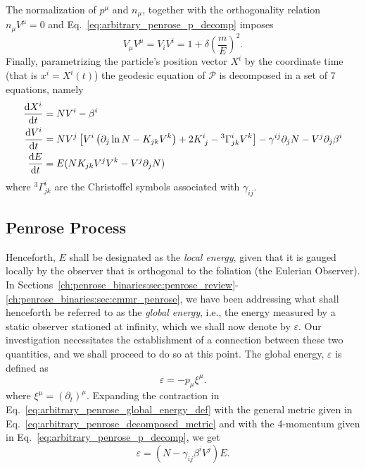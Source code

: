 The normalization of $p^\mu$ and $n_\mu$, together with the orthogonality relation $n_\mu V^\mu = 0$ and Eq.~\eqref{eq:arbitrary_penrose_p_decomp} imposes
%
\begin{equation}
  V_\mu V^\mu = V_i V^i  = 1 + \delta\left(\frac{m}{E}\right)^2.
  \label{eq:arbitrary_penrose_V_norm}
\end{equation}
%
Finally, parametrizing the particle's position vector $X^i$ by the coordinate time (that is $x^i = X^i(t)$) the geodesic equation of $\mathcal{P}$ is decomposed in a set of 7 equations, namely
%
\begin{align}
  \der{X^i}{t} & = N V^i - \beta^i \label{eq:arbitrary_penrose_geodesic_eq_X}                                                                                                                                                  \\
  \der{V^i}{t} & = N V^j\left[ V^i \left( \partial_j \ln N - K_{jk} V^k \right) + 2 \tens{K}{i}{j} - {}^3\Gamma^{i}_{jk}V^k\right] - \gamma^{ij}\partial_j N - V^j\partial_j\beta^i \label{eq:arbitrary_penrose_geodesic_eq_V} \\
  \der{E}{t}   & = E (N K_{jk} V^j V^k - V^j \partial_j N) \label{eq:arbitrary_penrose_geodesic_eq_E}
\end{align}
%
where ${}^3\Gamma^{i}_{jk}$ are the Christoffel symbols associated with $\gamma_{ij}$.

\subsection{Penrose Process}

Henceforth, $E$ shall be designated as the \emph{local energy}, given that it is gauged locally by the observer that is orthogonal to the foliation (the Eulerian Observer). In Sections~\ref{ch:penrose_binaries:sec:penrose_review}-\ref{ch:penrose_binaries:sec:cmmr_penrose}, we have been addressing what shall henceforth be referred to as the \emph{global energy}, i.e., the energy measured by a static observer stationed at infinity, which we shall now denote by $\varepsilon$. Our investigation necessitates the establishment of a connection between these two quantities, and we shall proceed to do so at this point. The global energy, $\varepsilon$ is defined as
%
\begin{equation}
  \varepsilon = - p_\mu \xi^\mu.
  \label{eq:arbitrary_penrose_global_energy_def}
\end{equation}
%
where $\xi^\mu = (\partial_t)^\mu$.
%
Expanding the contraction in Eq.~\eqref{eq:arbitrary_penrose_global_energy_def} with the general metric given in Eq.~\eqref{eq:arbitrary_penrose_decomposed_metric} and with the 4-momentum given in Eq.~\eqref{eq:arbitrary_penrose_p_decomp}, we get
%
\begin{equation}
  \varepsilon = \left( N - \gamma_{ij} \beta^i V^j \right) E.
  \label{eq:arbitrary_penrose_local_global_energy_relation}
\end{equation}

